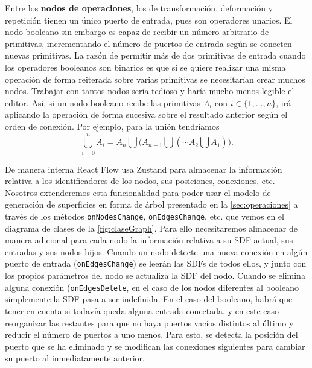 Entre los \textbf{nodos de operaciones}, los de transformación, deformación y repetición tienen un único puerto de entrada, pues son operadores unarios. El nodo booleano sin embargo es capaz de recibir un número arbitrario de primitivas, incrementando el número de puertos de entrada según se conecten nuevas primitivas. La razón de permitir más de dos primitivas de entrada cuando los operadores booleanos son binarios es que si se quiere realizar una misma operación de forma reiterada sobre varias primitivas se necesitarían crear muchos nodos. Trabajar con tantos nodos sería tedioso y haría mucho menos legible el editor. Así, si un nodo booleano recibe las primitivas $A_i$ con $i\in \{1,\dots, n\}$, irá aplicando la operación de forma sucesiva sobre el resultado anterior según el orden de conexión. Por ejemplo, para la unión tendríamos
\begin{equation*}
    \bigcup_{i=0}^n A_i = A_n\bigcup \Big(A_{n-1} \bigcup ( \cdots A_2 \bigcup A_1)\Big).
\end{equation*}

De manera interna React Flow usa Zustand para almacenar la información relativa a los identificadores de los nodos, sus posiciones, conexiones, etc. Nosotros extenderemos esta funcionalidad para poder usar el modelo de generación de superficies en forma de árbol presentado en la \autoref{sec:operaciones} a través de los métodos \texttt{onNodesChange}, \texttt{onEdgesChange}, etc. que vemos en el diagrama de clases de la \autoref{fig:claseGraph}. Para ello necesitaremos almacenar de manera adicional para cada nodo la información relativa a su SDF actual, sus entradas y sus nodos hijos. Cuando un nodo detecte una nueva conexión  en algún puerto de entrada (\texttt{onEdgesChange}) se leerán las SDFs de todos ellos, y junto con los propios parámetros del nodo se actualiza la SDF del nodo. Cuando se elimina alguna conexión (\texttt{onEdgesDelete}, en el caso de los nodos diferentes al booleano simplemente la SDF pasa a ser indefinida. En el caso del booleano, habrá que tener en cuenta si todavía queda alguna entrada conectada, y en este caso reorganizar las restantes para que no haya puertos vacíos distintos al último y reducir el número de puertos a uno menos. Para esto, se detecta la posición del puerto que se ha eliminado y se modifican las conexiones siguientes para cambiar su puerto al inmediatamente anterior. \newline

